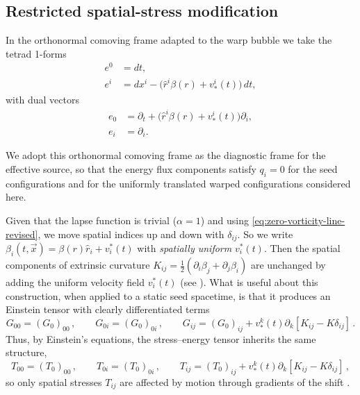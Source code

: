 \documentclass[11pt]{article}
\begin{document}
\subsection{Restricted spatial-stress modification}
In the orthonormal comoving frame adapted to the warp bubble we take the tetrad 1-forms
\begin{align}
e^0 &= dt, \\
e^i &= dx^i - \bigl(\hat{r}^i\beta(r) + v^i_*(t)\bigr)\,dt,
\end{align}
with dual vectors
\begin{align}
e_0 &= \partial_t + \bigl(\hat{r}^i\beta(r) + v^i_*(t)\bigr)\partial_i, \\
e_i &= \partial_i.
\end{align}

We adopt this orthonormal comoving frame as the diagnostic frame for the effective source, so that the energy flux components satisfy $q_i=0$ for the seed configurations and for the uniformly translated warped configurations considered here.

Given that the lapse function is trivial ($\alpha=1$) and using \eqref{eq:zero-vorticity-line-revised}, we move spatial indices up and down with $\delta_{ij}$. So we write $\beta_i(t,\vec x)=\beta(r)\hat r_i+v^*_i(t)$ with \emph{spatially uniform} $v^*_i(t)$. Then the spatial components of extrinsic curvature $K_{ij}=\tfrac12(\partial_i\beta_j+\partial_j\beta_i)$ are unchanged by adding the uniform velocity field $v^*_i(t)$ (see \cite{Schuster:2023ADMmass}). What is useful about this construction, when applied to a static seed spacetime, is that it produces an Einstein tensor with clearly differentiated terms
\begin{equation}
G_{00}=(G_0)_{00}\,,\qquad G_{0i}=(G_0)_{0i}\,, \qquad
G_{ij}= (G_{0})_{ij} + v^{k}_{*}(t)  \partial_{k}[K_{ij}-K\delta_{ij}]
\,.
\end{equation}
Thus, by Einstein's equations, the stress--energy tensor inherits the same structure,
\begin{equation}
T_{00}=(T_0)_{00}\,,\qquad T_{0i}=(T_0)_{0i}\,, \qquad
T_{ij}= (T_{0})_{ij} + v^{k}_{*}(t)  \partial_{k}[K_{ij}-K\delta_{ij}]\,,
\end{equation}
so only spatial stresses $T_{ij}$ are affected by motion through gradients of the shift
\cite{Santiago:2021aup,Schuster:2023ADMmass}.
\end{document}
